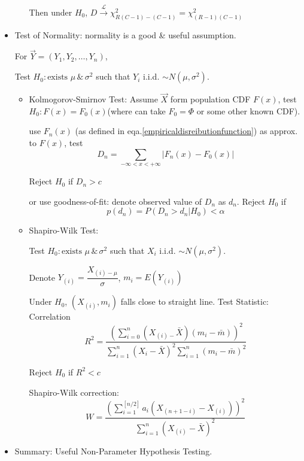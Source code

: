 \documentclass[11pt,a4paper]{ctexart}
\numberwithin{equation}{section}%
\begin{document}
\begin{itemize}
\begin{itemize}
    Then under $H_0$, $D\xrightarrow[]{\mathscr{L}}\chi^2_{R(C-1)-(C-1)}=\chi^2_{(R-1)(C-1)}$
    \end{itemize}

    \item Test of Normality: normality is a good \& useful assumption.
    
    For $\vec{Y}=(Y_1,Y_2,\ldots,Y_n)$,

    Test $H_0:\text{exists }\mu\,\&\, \sigma^2$ such that $Y_i$ i.i.d. $\sim N(\mu,\sigma^2)$.

    \begin{itemize}
        \item Kolmogorov-Smirnov Test: Assume $\vec{X}$ form population CDF $F(x)$, test $H_0:F(x)=F_0(x)$(where can take $F_0=\Phi$ or some other known CDF).
        
        use $F_n(x)$ (as defined in eqa.\ref{empiricaldisreibutionfunction}) as approx. to $F(x)$, test
        \[
            D_n=\sum_{-\infty< x<+\infty}|F_n(x)-F_0(x)|
        \]

        Reject $H_0$ if $D_n>c$

        or use goodness-of-fit: denote observed value of $D_n$ as $d_n$. Reject $H_0$ if
        \[
            p(d_n)=P(D_n>d_n|H_0)<\alpha
        \]

        \item Shapiro-Wilk Test:
        
        Test $H_0:\text{exists }\mu\,\&\, \sigma^2$ such that $X_i$ i.i.d. $\sim N(\mu,\sigma^2)$.

        Denote $Y_{(i)}=\dfrac{X_{(i)-\mu}}{\sigma}$, $m_i=E(Y_{(i)})$

        Under $H_0$, $(X_{(i)},m_i)$ falls close to straight line. Test Statistic: Correlation
        \[
            R^2=\dfrac{\left(\sum_{i=0}^n(X_{(i)-}\bar{X})(m_i-\bar{m})\right)^2}{\sum_{i=1}^n(X_{i}-\bar{X})^2\sum_{i=1}^n(m_i-\bar{m})^2}
        \]

        Reject $H_0$ if $R^2<c$

        Shapiro-Wilk correction:
        \[
            W=\dfrac{\left(\sum_{i=1}^{[n/2]}a_i(X_{(n+1-i)}-X_{(i)})\right)^2}{\sum_{i=1}^n(X_{(i)}-\bar{X})^2}
        \]
    \end{itemize}
\end{itemize}


\begin{itemize}[topsep=8pt]
    \item Summary: Useful Non-Parameter Hypothesis Testing.\\
\end{itemize}
\end{document}
